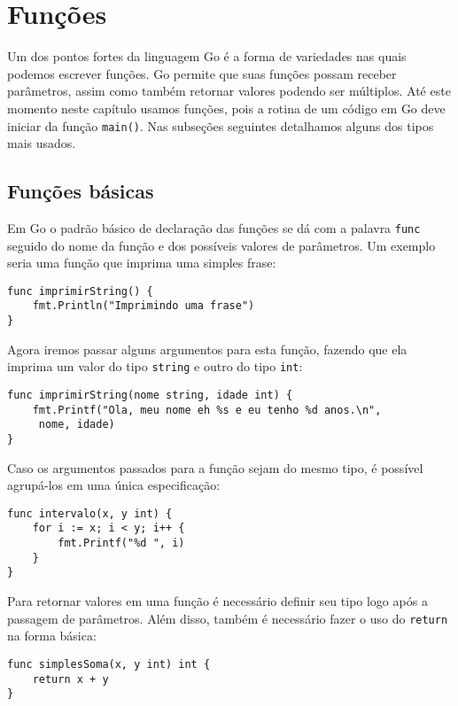 \documentclass{SBCbookchapter}
\begin{document}
\section{Funções}

Um dos pontos fortes da linguagem Go é a forma de variedades nas quais podemos escrever funções. Go permite que suas funções possam receber parâmetros, assim como também retornar valores podendo ser múltiplos. Até este momento neste capítulo usamos funções, pois a rotina de um código em Go deve iniciar da função \texttt{main()}. Nas subseções seguintes detalhamos alguns dos tipos mais usados.

\subsection{Funções básicas}

Em Go o padrão básico de declaração das funções se dá com a palavra \texttt{func} seguido do nome da função e dos possíveis valores de parâmetros. Um exemplo seria uma função que imprima uma simples frase:

\begin{lstlisting}
func imprimirString() {
	fmt.Println("Imprimindo uma frase")
}
\end{lstlisting}

Agora iremos passar alguns argumentos para esta função, fazendo que ela imprima um valor do tipo \texttt{string} e outro do tipo \texttt{int}:

\begin{lstlisting}
func imprimirString(nome string, idade int) {
	fmt.Printf("Ola, meu nome eh %s e eu tenho %d anos.\n",
	 nome, idade)
}
\end{lstlisting}

Caso os argumentos passados para a função sejam do mesmo tipo, é possível agrupá-los em uma única especificação:

\begin{lstlisting}
func intervalo(x, y int) {
	for i := x; i < y; i++ {
		fmt.Printf("%d ", i)
	}
}
\end{lstlisting}

Para retornar valores em uma função é necessário definir seu tipo logo após a passagem de parâmetros. Além disso, também é necessário fazer o uso do \texttt{return} na forma básica:

\begin{lstlisting}
func simplesSoma(x, y int) int {
	return x + y
}
\end{lstlisting}
\end{document}
